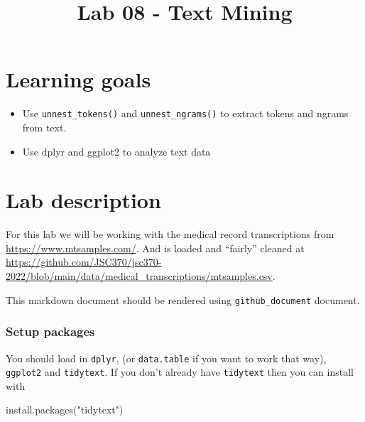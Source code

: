 \documentclass[
]{article}
\title{Lab 08 - Text Mining}
\author{}
\date{\vspace{-2.5em}}
\newenvironment{Shaded}{\begin{snugshade}}{\end{snugshade}}
\newcommand{\AttributeTok}[1]{\textcolor[rgb]{0.77,0.63,0.00}{#1}}
\newcommand{\FunctionTok}[1]{\textcolor[rgb]{0.00,0.00,0.00}{#1}}
\newcommand{\NormalTok}[1]{#1}
\newcommand{\SpecialCharTok}[1]{\textcolor[rgb]{0.00,0.00,0.00}{#1}}
\newcommand{\StringTok}[1]{\textcolor[rgb]{0.31,0.60,0.02}{#1}}
\providecommand{\tightlist}{%
  \setlength{\itemsep}{0pt}\setlength{\parskip}{0pt}}
\begin{document}
\maketitle

\begin{Shaded}
\end{Shaded}

\hypertarget{learning-goals}{%
\section{Learning goals}\label{learning-goals}}

\begin{itemize}
\tightlist
\item
  Use \texttt{unnest\_tokens()} and \texttt{unnest\_ngrams()} to extract
  tokens and ngrams from text.
\item
  Use dplyr and ggplot2 to analyze text data
\end{itemize}

\hypertarget{lab-description}{%
\section{Lab description}\label{lab-description}}

For this lab we will be working with the medical record transcriptions
from \url{https://www.mtsamples.com/}. And is loaded and ``fairly''
cleaned at
\url{https://github.com/JSC370/jsc370-2022/blob/main/data/medical_transcriptions/mtsamples.csv}.

This markdown document should be rendered using
\texttt{github\_document} document.

\hypertarget{setup-packages}{%
\subsubsection{Setup packages}\label{setup-packages}}

You should load in \texttt{dplyr}, (or \texttt{data.table} if you want
to work that way), \texttt{ggplot2} and \texttt{tidytext}. If you don't
already have \texttt{tidytext} then you can install with

\begin{Shaded}
\begin{Highlighting}[]
\FunctionTok{install.packages}\NormalTok{(}\StringTok{"tidytext"}\NormalTok{)}
\end{Highlighting}
\end{Shaded}
\end{document}
